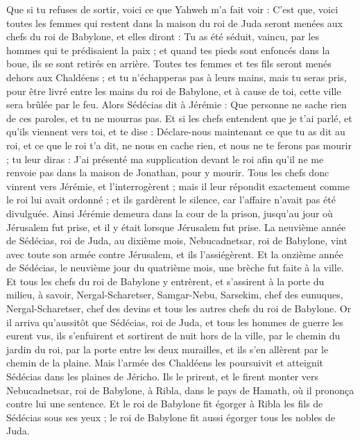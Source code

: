 \begin{multicols}{2}
Que si tu refuses de sortir, voici ce que Yahweh m'a fait voir :
C'est que, voici toutes les femmes qui restent dans la maison du roi de Juda seront menées aux chefs du roi de Babylone, et elles diront : Tu as été séduit, vaincu, par les hommes qui te prédisaient la paix ; et quand tes pieds sont enfoncés dans la boue, ils se sont retirés en arrière.
Toutes tes femmes et tes fils seront menés dehors aux Chaldéens ; et tu n'échapperas pas à leurs mains, mais tu seras pris, pour être livré entre les mains du roi de Babylone, et à cause de toi, cette ville sera brûlée par le feu.
Alors Sédécias dit à Jérémie : Que personne ne sache rien de ces paroles, et tu ne mourras pas.
Et si les chefs entendent que je t'ai parlé, et qu'ils viennent vers toi, et te dise : Déclare-nous maintenant ce que tu as dit au roi, et ce que le roi t'a dit, ne nous en cache rien, et nous ne te ferons pas mourir ;
tu leur diras : J'ai présenté ma supplication devant le roi afin qu'il ne me renvoie pas dans la maison de Jonathan, pour y mourir.
Tous les chefs donc vinrent vers Jérémie, et l'interrogèrent ; mais il leur répondit exactement comme le roi lui avait ordonné ; et ils gardèrent le silence, car l'affaire n'avait pas été divulguée.
Ainsi Jérémie demeura dans la cour de la prison, jusqu'au jour où Jérusalem fut prise, et il y était lorsque Jérusalem fut prise.
\VerseOne{}La neuvième année de Sédécias, roi de Juda, au dixième mois, Nebucadnetsar, roi de Babylone, vint avec toute son armée contre Jérusalem, et ils l'assiégèrent.
Et la onzième année de Sédécias, le neuvième jour du quatrième mois, une brèche fut faite à la ville.
Et tous les chefs du roi de Babylone y entrèrent, et s'assirent à la porte du milieu, à savoir, Nergal-Scharetser, Samgar-Nebu, Sarsekim, chef des eunuques, Nergal-Scharetser, chef des devins et tous les autres chefs du roi de Babylone.
Or il arriva qu'aussitôt que Sédécias, roi de Juda, et tous les hommes de guerre les eurent vus, ils s'enfuirent et sortirent de nuit hors de la ville, par le chemin du jardin du roi, par la porte entre les deux murailles, et ils s'en allèrent par le chemin de la plaine.
Mais l'armée des Chaldéens les poursuivit et atteignit Sédécias dans les plaines de Jéricho. Ils le prirent, et le firent monter vers Nebucadnetsar, roi de Babylone, à Ribla, dans le pays de Hamath, où il prononça contre lui une sentence.
Et le roi de Babylone fit égorger à Ribla les fils de Sédécias sous ses yeux ; le roi de Babylone fit aussi égorger tous les nobles de Juda.

\end{multicols}
